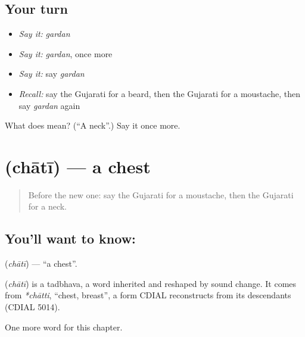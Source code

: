 \subsection*{Your turn}
\begin{itemize}
\raggedright
  \item \emph{Say it:} \emph{gardan}
  \item \emph{Say it:} \emph{gardan}, once more
  \item \emph{Say it:} say \emph{gardan}
  \item \emph{Recall:} say the Gujarati for a beard, then the Gujarati for a moustache, then say \emph{gardan} again
\end{itemize}

\begin{tcolorbox}[breakable,colback=teal!4,colframe=teal!35!black,title={Before you move on}]
What does  mean? (\textquotedblleft{}A neck\textquotedblright{}.) Say it once more.
\end{tcolorbox}
\section[\texorpdfstring{\gu{છાતી} (chātī)}{છાતી (chātī)}]{ (chātī) — a chest}

\label{lesson:GU-C125-chati}



\begin{quote}
Before the new one: say the Gujarati for a moustache, then the Gujarati for a neck.
\end{quote}

\subsection*{You'll want to know: }
\textbf{} (\emph{chātī}) — \textquotedblleft{}a chest\textquotedblright{}.

\begin{cousinweb}
\textbf{} (\emph{chātī}) is a tadbhava, a word inherited and reshaped by sound change. It comes from \emph{*chātti}, \textquotedblleft{}chest, breast\textquotedblright{}, a form CDIAL reconstructs from its descendants (CDIAL 5014).
\end{cousinweb}

\begin{grammarlens}[title={What you've built}]
One more word for this chapter.
\end{grammarlens}

